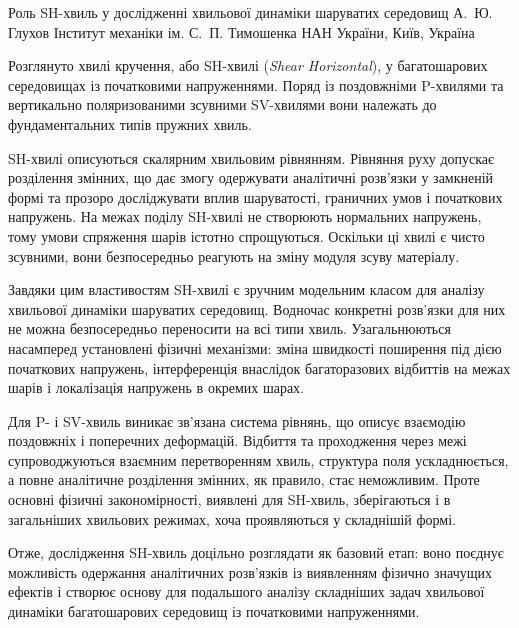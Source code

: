 \ReportHeading
  {Роль SH-хвиль у дослідженні хвильової динаміки шаруватих середовищ}
  {А.~Ю. Глухов}
  {Інститут механіки ім. С.~П. Тимошенка НАН України, Київ, Україна}
  {}

Розглянуто хвилі кручення, або SH-хвилі (\emph{Shear Horizontal}), у багатошарових середовищах із початковими напруженнями. Поряд із поздовжніми P-хвилями та вертикально поляризованими зсувними SV-хвилями вони належать до фундаментальних типів пружних хвиль.

SH-хвилі описуються скалярним хвильовим рівнянням. Рівняння руху допускає розділення змінних, що дає змогу одержувати аналітичні розв’язки у замкненій формі та прозоро досліджувати вплив шаруватості, граничних умов і початкових напружень. На межах поділу SH-хвилі не створюють нормальних напружень, тому умови спряження шарів істотно спрощуються. Оскільки ці хвилі є чисто зсувними, вони безпосередньо реагують на зміну модуля зсуву матеріалу.

Завдяки цим властивостям SH-хвилі є зручним модельним класом для аналізу хвильової динаміки шаруватих середовищ. Водночас конкретні розв’язки для них не можна безпосередньо переносити на всі типи хвиль. Узагальнюються насамперед установлені фізичні механізми: зміна швидкості поширення під дією початкових напружень, інтерференція внаслідок багаторазових відбиттів на межах шарів і локалізація напружень в окремих шарах.

Для P- і SV-хвиль виникає зв’язана система рівнянь, що описує взаємодію поздовжніх і поперечних деформацій. Відбиття та проходження через межі супроводжуються взаємним перетворенням хвиль, структура поля ускладнюється, а повне аналітичне розділення змінних, як правило, стає неможливим. Проте основні фізичні закономірності, виявлені для SH-хвиль, зберігаються і в загальніших хвильових режимах, хоча проявляються у складнішій формі.

Отже, дослідження SH-хвиль доцільно розглядати як базовий етап: воно поєднує можливість одержання аналітичних розв’язків із виявленням фізично значущих ефектів і створює основу для подальшого аналізу складніших задач хвильової динаміки багатошарових середовищ із початковими напруженнями.
